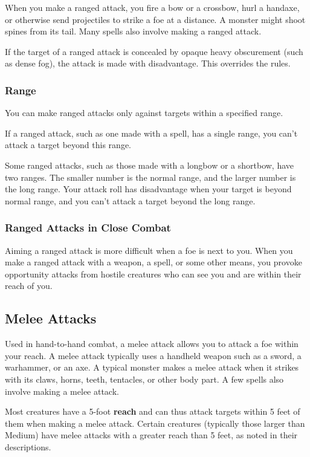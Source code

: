 When you make a ranged attack, you fire a bow or a crossbow, hurl a handaxe, or otherwise send projectiles to strike a foe at a distance. A monster might shoot spines from its tail. Many spells also involve making a ranged attack.

If the target of a ranged attack is concealed by opaque heavy obscurement (such as dense fog), the attack is made with disadvantage. This overrides the  rules.

\subsubsection{Range}

You can make ranged attacks only against targets within a specified range.

If a ranged attack, such as one made with a spell, has a single range, you can't attack a target beyond this range.

Some ranged attacks, such as those made with a longbow or a shortbow, have two ranges. The smaller number is the normal range, and the larger number is the long range. Your attack roll has disadvantage when your target is beyond normal range, and you can't attack a target beyond the long range.

\subsubsection{Ranged Attacks in Close Combat}

Aiming a ranged attack is more difficult when a foe is next to you. When you make a ranged attack with a weapon, a spell, or some other means, you provoke opportunity attacks from hostile creatures who can see you and are within their reach of you.

\subsection{Melee Attacks}

Used in hand-to-hand combat, a melee attack allows you to attack a foe within your reach. A melee attack typically uses a handheld weapon such as a sword, a warhammer, or an axe. A typical monster makes a melee attack when it strikes with its claws, horns, teeth, tentacles, or other body part. A few spells also involve making a melee attack.

Most creatures have a 5-foot \textbf{reach} and can thus attack targets within 5 feet of them when making a melee attack. Certain creatures (typically those larger than Medium) have melee attacks with a greater reach than 5 feet, as noted in their descriptions.

